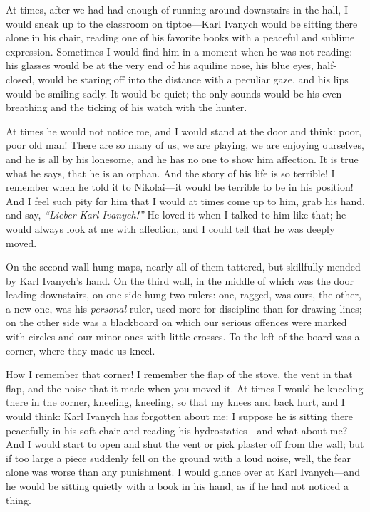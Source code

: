 At times, after we had had enough of running around downstairs in the hall, I would sneak up to the classroom on tiptoe---Karl Ivanych would be sitting there alone in his chair, reading one of his favorite books with a peaceful and sublime expression. Sometimes I would find him in a moment when he was not reading: his glasses would be at the very end of his aquiline nose, his blue eyes, half-closed, would be staring off into the distance with a peculiar gaze, and his lips would be smiling sadly. It would be quiet; the only sounds would be his even breathing and the ticking of his watch with the hunter.

At times he would not notice me, and I would stand at the door and think: poor, poor old man! There are so many of us, we are playing, we are enjoying ourselves, and he is all by his lonesome,  and he has no one to show him affection. It is true what he says, that he is an orphan. And the story of his life is so terrible! I remember when he told it to Nikolai---it would be terrible to be in his position! And I feel such pity for him that I would at times come up to him, grab his hand, and say, \textit{``Lieber Karl Ivanych!''} He loved it when I talked to him like that; he would always look at me with affection, and I could tell that he was deeply moved.

On the second wall hung maps, nearly all of them tattered, but skillfully mended by Karl Ivanych's hand. On the third wall, in the middle of which was the door leading downstairs, on one side hung two rulers: one, ragged, was ours, the other, a new one, was his \emph{personal} ruler, used more for discipline than for drawing lines; on the other side was a blackboard on which our serious offences were marked with circles and our minor ones with little crosses. To the left of the board was a corner, where they made us kneel.

How I remember that corner! I remember the flap of the stove, the vent in that flap, and the noise that it made when you moved it. At times I would be kneeling there in the corner, kneeling, kneeling, so that my knees and back hurt, and I would think: Karl Ivanych has forgotten about me: I suppose he is sitting there peacefully in his soft chair and reading his hydrostatics---and what about me? And I would start to open and shut the vent or pick plaster off from the wall; but if too large a piece suddenly fell on the ground with a loud noise, well, the fear alone was worse than any punishment. I would glance over at Karl Ivanych---and he would be sitting quietly with a book in his hand, as if he had not noticed a thing.

